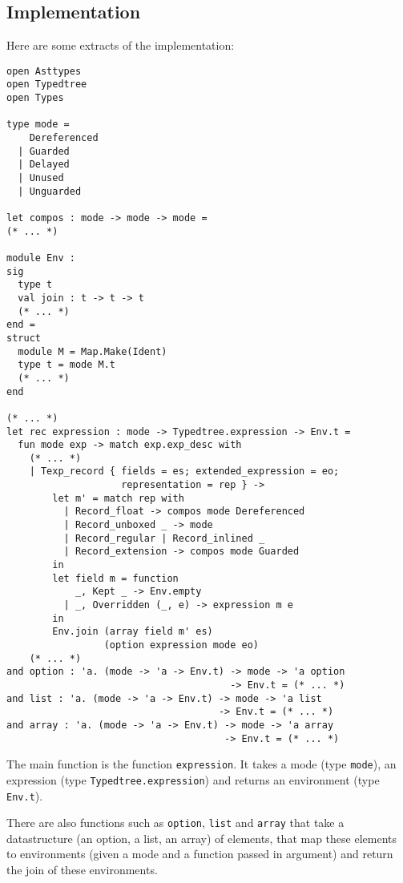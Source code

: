 \documentclass{article}
\begin{document}
\subsection{Implementation}

Here are some extracts of the implementation:
\begin{lstlisting}
open Asttypes
open Typedtree
open Types

type mode =
    Dereferenced
  | Guarded
  | Delayed
  | Unused
  | Unguarded

let compos : mode -> mode -> mode =
(* ... *)

module Env :
sig
  type t
  val join : t -> t -> t
  (* ... *)
end =
struct
  module M = Map.Make(Ident)
  type t = mode M.t
  (* ... *)
end

(* ... *)
let rec expression : mode -> Typedtree.expression -> Env.t =
  fun mode exp -> match exp.exp_desc with
    (* ... *)
    | Texp_record { fields = es; extended_expression = eo;
                    representation = rep } ->
        let m' = match rep with
          | Record_float -> compos mode Dereferenced
          | Record_unboxed _ -> mode
          | Record_regular | Record_inlined _
          | Record_extension -> compos mode Guarded
        in
        let field m = function
            _, Kept _ -> Env.empty
          | _, Overridden (_, e) -> expression m e
        in
        Env.join (array field m' es)
                 (option expression mode eo)
    (* ... *)
and option : 'a. (mode -> 'a -> Env.t) -> mode -> 'a option
                                       -> Env.t = (* ... *)
and list : 'a. (mode -> 'a -> Env.t) -> mode -> 'a list
                                     -> Env.t = (* ... *)
and array : 'a. (mode -> 'a -> Env.t) -> mode -> 'a array
                                      -> Env.t = (* ... *)
\end{lstlisting}

The main function is the function \lstinline|expression|. It takes a mode (type
\lstinline|mode|), an expression (type \lstinline|Typedtree.expression|) and
returns an environment (type \lstinline|Env.t|).

There are also functions such as \lstinline|option|, \lstinline|list| and
\lstinline|array| that take a datastructure (an option, a list, an array) of
elements, that map these elements to environments (given a mode and a function
passed in argument) and return the join of these environments.



\end{document}
